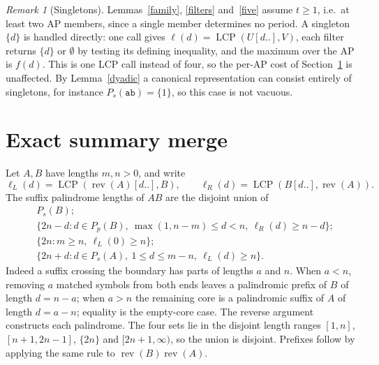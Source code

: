 ﻿\documentclass[11pt]{article}
\theoremstyle{plain}
\theoremstyle{remark}
\newtheorem{remark}[theorem]{Remark}
\begin{document}
\begin{remark}[Singletons]\label{singleton}
Lemmas~\ref{family}, \ref{filters} and~\ref{five} assume $t\ge1$, i.e.\ at least two AP members, since a single member determines no period. A singleton $\{d\}$ is handled directly: one call gives $\ell(d)=\operatorname{LCP}(U[d..],V)$, each filter returns $\{d\}$ or $\emptyset$ by testing its defining inequality, and the maximum over the AP is $f(d)$. This is one LCP call instead of four, so the per-AP cost of Section~\ref{sec:merge} is unaffected. By Lemma~\ref{dyadic} a canonical representation can consist entirely of singletons, for instance $P_s(\texttt{ab})=\{1\}$, so this case is not vacuous.
\end{remark}

\section{Exact summary merge}\label{sec:merge}
Let $A,B$ have lengths $m,n>0$, and write
\[
\ell_L(d)=\operatorname{LCP}(\operatorname{rev}(A)[d..],B),\qquad
\ell_R(d)=\operatorname{LCP}(B[d..],\operatorname{rev}(A)).
\]
The suffix palindrome lengths of $AB$ are the disjoint union of
\begin{align*}
&P_s(B);\\
&\{2n-d:d\in P_p(B),\ \max(1,n-m)\le d<n,\ \ell_R(d)\ge n-d\};\\
&\{2n:m\ge n,\ \ell_L(0)\ge n\};\\
&\{2n+d:d\in P_s(A),\ 1\le d\le m-n,\ \ell_L(d)\ge n\}.
\end{align*}
Indeed a suffix crossing the boundary has parts of lengths $a$ and $n$. When $a<n$, removing $a$ matched symbols from both ends leaves a palindromic prefix of $B$ of length $d=n-a$; when $a>n$ the remaining core is a palindromic suffix of $A$ of length $d=a-n$; equality is the empty-core case. The reverse argument constructs each palindrome. The four sets lie in the disjoint length ranges $[1,n]$, $[n+1,2n-1]$, $\{2n\}$ and $[2n+1,\infty)$, so the union is disjoint. Prefixes follow by applying the same rule to $\operatorname{rev}(B)\operatorname{rev}(A)$.
\end{document}
